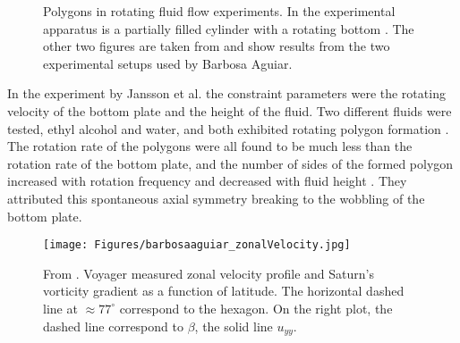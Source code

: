 \documentclass[preprint]{revtex4-1} %
\begin{document}
\begin{figure}
  \centering
  \caption{Polygons in rotating fluid flow experiments.  In
     the experimental apparatus is a partially
    filled cylinder with a rotating bottom \cite{Jansson2006}.  The
    other two figures are taken from
    \cite[fig~9,10]{BarbosaAguiar2010} and show results from the two
    experimental setups used by Barbosa Aguiar.} 
  \label{fig:exppolys}
\end{figure}

In the experiment by Jansson et al. the constraint parameters were
the rotating velocity of the bottom plate and the height of the
fluid.  Two different fluids were tested, ethyl alcohol and water, and
both exhibited rotating polygon formation \cite{Jansson2006}.  The
rotation rate of the polygons were all found to be much less than the
rotation rate of the bottom plate, and the number of sides of the
formed polygon increased with rotation frequency and decreased with fluid height
\cite{Jansson2006}.  They attributed this spontaneous axial symmetry
breaking to the wobbling of the bottom plate.

\begin{figure}[ht]
  \centering
  \texttt{[image: Figures/barbosaaguiar\_zonalVelocity.jpg]}
  \caption{From \cite[fig~1]{BarbosaAguiar2010}.  Voyager measured zonal velocity
    profile and Saturn's vorticity gradient as a function of
    latitude.  The horizontal dashed line at $\approx 77^{\circ}$ correspond to
    the hexagon.  On the right plot, the dashed line
    correspond to $\beta$, the solid line $u_{yy}$.} 
  \label{fig:zonalV_vorticityGrad}
\end{figure}
\end{document}
